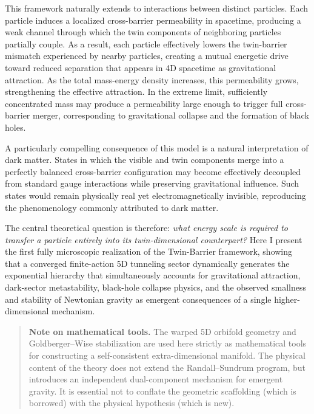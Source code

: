 \documentclass[
  11pt,
]{article}
\begin{document}
This framework naturally extends to interactions between distinct
particles. Each particle induces a localized cross-barrier permeability
in spacetime, producing a weak channel through which the twin components
of neighboring particles partially couple. As a result, each particle
effectively lowers the twin-barrier mismatch experienced by nearby
particles, creating a mutual energetic drive toward reduced separation
that appears in 4D spacetime as gravitational attraction. As the total
mass-energy density increases, this permeability grows, strengthening
the effective attraction. In the extreme limit, sufficiently
concentrated mass may produce a permeability large enough to trigger
full cross-barrier merger, corresponding to gravitational collapse and
the formation of black holes.

A particularly compelling consequence of this model is a natural
interpretation of dark matter. States in which the visible and twin
components merge into a perfectly balanced cross-barrier configuration
may become effectively decoupled from standard gauge interactions while
preserving gravitational influence. Such states would remain physically
real yet electromagnetically invisible, reproducing the phenomenology
commonly attributed to dark matter.

The central theoretical question is therefore: \emph{what energy scale
is required to transfer a particle entirely into its twin-dimensional
counterpart?} Here I present the first fully microscopic realization of
the Twin-Barrier framework, showing that a converged finite-action 5D
tunneling sector dynamically generates the exponential hierarchy that
simultaneously accounts for gravitational attraction, dark-sector
metastability, black-hole collapse physics, and the observed smallness
and stability of Newtonian gravity as emergent consequences of a single
higher-dimensional mechanism.

\begin{quote}
\textbf{Note on mathematical tools.} The warped 5D orbifold geometry and
Goldberger--Wise stabilization are used here strictly as mathematical
tools for constructing a self-consistent extra-dimensional manifold. The
physical content of the theory does not extend the Randall--Sundrum
program, but introduces an independent dual-component mechanism for
emergent gravity. It is essential not to conflate the geometric
scaffolding (which is borrowed) with the physical hypothesis (which is
new).
\end{quote}
\end{document}
